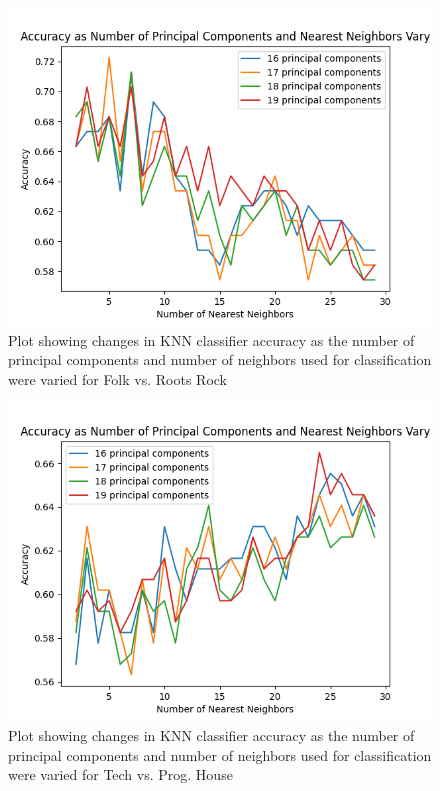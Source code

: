 \documentclass[letterpaper, 12 pt, conference]{ieeeconf}  %
\begin{document}
\begin{figure}[H]
    \centering
    \includegraphics[width=.8\linewidth]{knnplot_frrr.png}
    \caption{Plot showing changes in KNN classifier accuracy as the number of principal components and number of neighbors used for classification were varied for Folk vs. Roots Rock}
    \label{fig:knngraph3}
\end{figure}
\begin{figure}[H]
    \centering
    \includegraphics[width=.8\linewidth]{knnplot_thph.png}
    \caption{Plot showing changes in KNN classifier accuracy as the number of principal components and number of neighbors used for classification were varied for Tech vs. Prog. House}
    \label{fig:knngraph4}
\end{figure}
\end{document}
